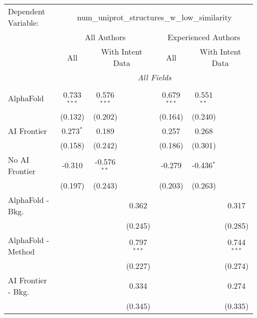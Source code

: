 \begingroup
\centering
\begin{tabular}{lcccccc}
   \tabularnewline \midrule \midrule
   Dependent Variable: & \multicolumn{6}{c}{num\_uniprot\_structures\_w\_low\_similarity}\\
 & \multicolumn{3}{c}{All Authors} & \multicolumn{3}{c}{Experienced Authors} \\
\cmidrule(lr){2-4} \cmidrule(lr){5-7}
 & \multicolumn{1}{c}{All} & \multicolumn{2}{c}{With Intent Data} & \multicolumn{1}{c}{All} & \multicolumn{2}{c}{With Intent Data} \\
\cmidrule(lr){2-2} \cmidrule(lr){3-4} \cmidrule(lr){5-5} \cmidrule(lr){6-7}
 & \multicolumn{6}{c}{\textit{All Fields}} \\ \\
   AlphaFold               & 0.733$^{***}$ & 0.576$^{***}$ &               & 0.679$^{***}$ & 0.551$^{**}$ &   \\   
                           & (0.132)       & (0.202)       &               & (0.164)       & (0.240)      &   \\   
   AI Frontier             & 0.273$^{*}$   & 0.189         &               & 0.257         & 0.268        &   \\   
                           & (0.158)       & (0.242)       &               & (0.186)       & (0.301)      &   \\   
   No AI Frontier          & -0.310        & -0.576$^{**}$ &               & -0.279        & -0.436$^{*}$ &   \\   
                           & (0.197)       & (0.243)       &               & (0.203)       & (0.263)      &   \\   
   AlphaFold - Bkg.        &               &               & 0.362         &               &              & 0.317\\   
                           &               &               & (0.245)       &               &              & (0.285)\\   
   AlphaFold - Method      &               &               & 0.797$^{***}$ &               &              & 0.744$^{***}$\\   
                           &               &               & (0.227)       &               &              & (0.274)\\   
   AI Frontier - Bkg.      &               &               & 0.334         &               &              & 0.274\\   
                           &               &               & (0.345)       &               &              & (0.335)\\   

\end{tabular}

